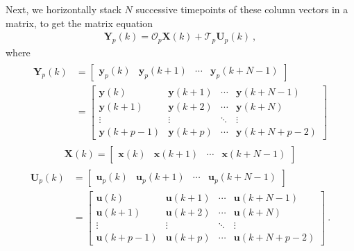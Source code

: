 \documentclass[letterpaper,10pt,english]{sphinxmanual}
\begin{document}
\sphinxAtStartPar
Next, we horizontally stack \(N\) successive timepoints of these
column vectors in a matrix, to get the matrix equation
\begin{equation*}
\begin{split}\boxed{\mathbf{Y}_{p}(k) = \mathcal{O}_{p}\mathbf{X}(k) + \mathcal{T}_{p}\mathbf{U}_{p}(k)} ~,\end{split}
\end{equation*}
\sphinxAtStartPar
where
\begin{equation*}
\begin{split}\begin{aligned}
\mathbf{Y}_{p}(k) &= \begin{bmatrix} \mathbf{y}_{p}(k) & \mathbf{y}_{p}(k+1) & \cdots & \mathbf{y}_{p}(k+N-1) \end{bmatrix} \\
&= \begin{bmatrix}
\mathbf{y}(k)     & \mathbf{y}(k+1) & \cdots & \mathbf{y}(k+N-1)\\
\mathbf{y}(k+1)   & \mathbf{y}(k+2) & \cdots & \mathbf{y}(k+N)  \\
\vdots            & \vdots          & \ddots & \vdots \\
\mathbf{y}(k+p-1) & \mathbf{y}(k+p) & \cdots & \mathbf{y}(k+N+p-2)
\end{bmatrix}
\end{aligned}\end{split}
\end{equation*}\begin{equation*}
\begin{split}\mathbf{X}(k) = \begin{bmatrix} \mathbf{x}(k) & \mathbf{x}(k+1) & \cdots & \mathbf{x}(k+N-1) \end{bmatrix}\end{split}
\end{equation*}\begin{equation*}
\begin{split}\begin{aligned}
\mathbf{U}_{p}(k) &= \begin{bmatrix} \mathbf{u}_{p}(k) & \mathbf{u}_{p}(k+1) & \cdots & \mathbf{u}_{p}(k+N-1) \end{bmatrix} \\
&= \begin{bmatrix}
\mathbf{u}(k)     & \mathbf{u}(k+1) & \cdots & \mathbf{u}(k+N-1)\\
\mathbf{u}(k+1)   & \mathbf{u}(k+2) & \cdots & \mathbf{u}(k+N)  \\
\vdots            & \vdots          & \ddots & \vdots \\
\mathbf{u}(k+p-1) & \mathbf{u}(k+p) & \cdots & \mathbf{u}(k+N+p-2)
\end{bmatrix}~.
\end{aligned}\end{split}
\end{equation*}
\end{document}
